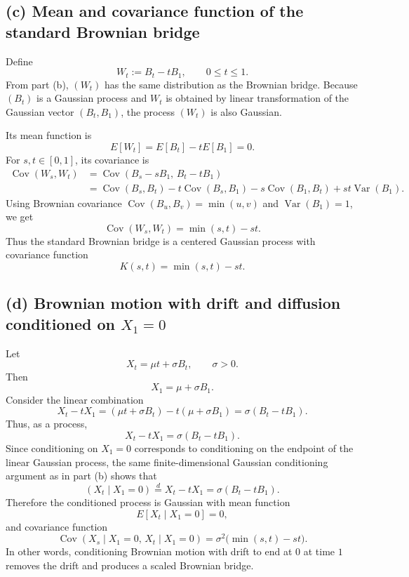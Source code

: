 \documentclass[11pt]{article}
\begin{document}
\subsection*{(c) Mean and covariance function of the standard Brownian bridge}
Define
\[
W_t:=B_t-tB_1,\qquad 0\le t\le1.
\]
From part (b), $(W_t)$ has the same distribution as the Brownian bridge. Because $(B_t)$ is a Gaussian process and $W_t$ is obtained by linear transformation of the Gaussian vector $(B_t,B_1)$, the process $(W_t)$ is also Gaussian.

Its mean function is
\[
E[W_t]=E[B_t]-tE[B_1]=0.
\]
For $s,t\in[0,1]$, its covariance is
\begin{align*}
\operatorname{Cov}(W_s,W_t)
&=\operatorname{Cov}(B_s-sB_1,\,B_t-tB_1)\\
&=\operatorname{Cov}(B_s,B_t)-t\operatorname{Cov}(B_s,B_1)-s\operatorname{Cov}(B_1,B_t)+st\operatorname{Var}(B_1).
\end{align*}
Using Brownian covariance $\operatorname{Cov}(B_u,B_v)=\min(u,v)$ and $\operatorname{Var}(B_1)=1$, we get
\[
\operatorname{Cov}(W_s,W_t)=\min(s,t)-st.
\]
Thus the standard Brownian bridge is a centered Gaussian process with covariance function
\[
K(s,t)=\min(s,t)-st.
\]

\subsection*{(d) Brownian motion with drift and diffusion conditioned on $X_1=0$}
Let
\[
X_t=\mu t+\sigma B_t,
\qquad \sigma>0.
\]
Then
\[
X_1=\mu+\sigma B_1.
\]
Consider the linear combination
\[
X_t-tX_1=(\mu t+\sigma B_t)-t(\mu+\sigma B_1)=\sigma(B_t-tB_1).
\]
Thus, as a process,
\[
X_t-tX_1=\sigma(B_t-tB_1).
\]
Since conditioning on $X_1=0$ corresponds to conditioning on the endpoint of the linear Gaussian process, the same finite-dimensional Gaussian conditioning argument as in part (b) shows that
\[
(X_t\mid X_1=0)\overset{d}=X_t-tX_1=\sigma(B_t-tB_1).
\]
Therefore the conditioned process is Gaussian with mean function
\[
E[X_t\mid X_1=0]=0,
\]
and covariance function
\[
\operatorname{Cov}(X_s\mid X_1=0,\,X_t\mid X_1=0)
=\sigma^2\bigl(\min(s,t)-st\bigr).
\]
In other words, conditioning Brownian motion with drift to end at $0$ at time $1$ removes the drift and produces a scaled Brownian bridge.
\end{document}

